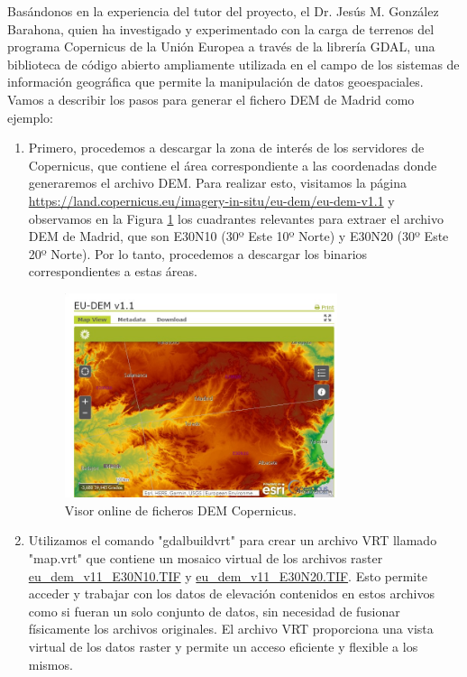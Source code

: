 \documentclass[a4paper, 11pt]{book}
\begin{document}
Basándonos en la experiencia del tutor del proyecto, el Dr. Jesús M. González Barahona, quien ha investigado y experimentado con la carga de terrenos del programa Copernicus de la Unión Europea a través de la librería GDAL, una biblioteca de código abierto ampliamente utilizada en el campo de los sistemas de información geográfica que permite la manipulación de datos geoespaciales.
Vamos a describir los pasos para generar el fichero DEM de Madrid como ejemplo:
\label{manual:generacionDem}
\begin{enumerate}
    \item Primero, procedemos a descargar la zona de interés de los servidores de Copernicus, que contiene el área correspondiente a las coordenadas donde generaremos el archivo DEM. Para realizar esto, visitamos la página \url{https://land.copernicus.eu/imagery-in-situ/eu-dem/eu-dem-v1.1} y observamos en la Figura \ref{fig:copernicus} los cuadrantes relevantes para extraer el archivo DEM de Madrid, que son E30N10 (30º Este 10º Norte) y E30N20 (30º Este 20º Norte). Por lo tanto, procedemos a descargar los binarios correspondientes a estas áreas.
\begin{figure}[H]
  \centering
  \includegraphics[width=8cm, keepaspectratio]{img/copernicus.jpg}
  \caption{Visor online de ficheros DEM Copernicus.}
  \label{fig:copernicus}
\end{figure}
    \item Utilizamos el comando "gdalbuildvrt" para crear un archivo VRT llamado "map.vrt" que contiene un mosaico virtual de los archivos raster \url{eu_dem_v11_E30N10.TIF} y \url{eu_dem_v11_E30N20.TIF}. Esto permite acceder y trabajar con los datos de elevación contenidos en estos archivos como si fueran un solo conjunto de datos, sin necesidad de fusionar físicamente los archivos originales. El archivo VRT proporciona una vista virtual de los datos raster y permite un acceso eficiente y flexible a los mismos.


\end{enumerate}
\end{document}
